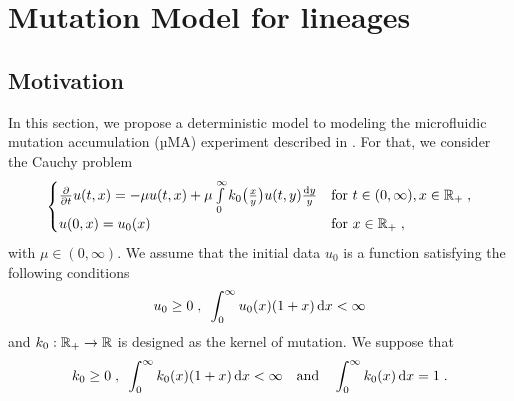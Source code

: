 \documentclass[11pt]{amsart}
\newcommand{\diff}{\,\mathrm{d}}
\begin{document}
\section{Mutation Model for lineages}
\label{s:lineage}
    \subsection{Motivation}\mbox{}
    In this section, we propose a deterministic model to modeling the microfluidic mutation accumulation (µMA) experiment described in \cite{robert2018mutation}. For that, we consider the Cauchy problem
    \begin{equation}
        \begin{cases}
        \frac{\partial}{\partial t}u(t,x) = - \mu u(t,x) + \mu \int\limits_{0}^{\infty} k_0\big( \frac{x}{y}\big)u(t,y) \frac{\mathrm dy}{y}
        & \text{for } t \in (0, \infty), x \in \mathbb{R}_+ \; ,
        \\
        u(0, x) = u_0(x)
        & \text{for } x \in \mathbb{R}_+
        \; ,
        \end{cases}
        \label{eq:main}
    \end{equation}
    with $\mu \in (0, \infty)$. We assume that the initial data $u_0$ is a function satisfying the following conditions 
    \begin{align}
        \label{H:u0_L1}
        u_0 \geq 0 \eqsepv \int_0^\infty u_0(x)(1+x)\diff x < \infty
    \end{align}
    and $k_0:   \mathbb{R}_+ \to \mathbb{R}$ is designed as the kernel of mutation. We suppose that 
    \begin{align}
        \label{H:k_0}
        k_0 \geq 0 \eqsepv \int_0^\infty k_0(x)(1+x)\diff x < \infty \mtext{and} \int_0^\infty k_0(x)\diff x = 1 \eqfinp
    \end{align}
\end{document}
